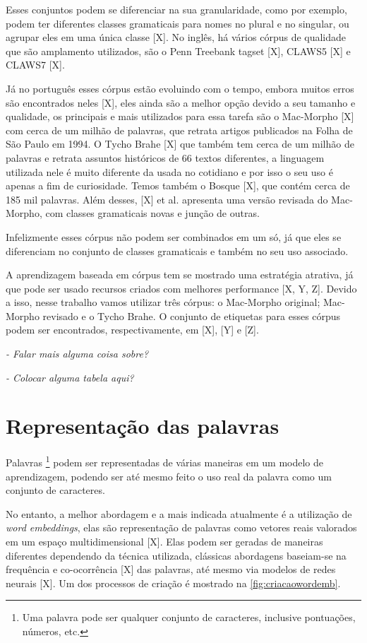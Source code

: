 Esses conjuntos podem se diferenciar na sua granularidade, como por exemplo, podem ter diferentes classes gramaticais para nomes no plural e no singular, ou agrupar eles em uma única classe [X]. No inglês, há vários córpus de qualidade que são amplamento utilizados, são o Penn Treebank tagset [X], CLAWS5 [X] e CLAWS7 [X].

Já no português esses córpus estão evoluindo com o tempo, embora muitos erros são encontrados neles [X], eles ainda são a melhor opção devido a seu tamanho e qualidade, os principais e mais utilizados para essa tarefa são o Mac-Morpho [X] com cerca de um milhão de palavras, que retrata artigos publicados na Folha de São Paulo em 1994. O Tycho Brahe [X] que também tem cerca de um milhão de palavras e retrata assuntos históricos de 66 textos diferentes, a linguagem utilizada nele é muito diferente da usada no cotidiano e por isso o seu uso é apenas a fim de curiosidade. Temos também o Bosque [X], que contém cerca de 185 mil palavras. Além desses, [X] et al. apresenta uma versão revisada do Mac-Morpho, com classes gramaticais novas e junção de outras. 

Infelizmente esses córpus não podem ser combinados em um só, já que eles se diferenciam no conjunto de classes gramaticais e também no seu uso associado.

A aprendizagem baseada em córpus tem se mostrado uma estratégia atrativa, já que pode ser usado recursos criados com melhores performance [X, Y, Z]. Devido a isso, nesse trabalho vamos utilizar três córpus: o Mac-Morpho original; Mac-Morpho revisado e o Tycho Brahe. O conjunto de etiquetas para esses córpus podem ser encontrados, respectivamente, em [X], [Y] e [Z].


\textit{- Falar mais alguma coisa sobre?}

\textit{- Colocar alguma tabela aqui?}



\section{Representação das palavras}\label{sec:representacaodaspalavras}

Palavras \footnote{Uma palavra pode ser qualquer conjunto de caracteres, inclusive pontuações, números, etc.} podem ser representadas de várias maneiras em um modelo de aprendizagem, podendo ser até mesmo feito o uso real da palavra como um conjunto de caracteres.

No entanto, a melhor abordagem e a mais indicada atualmente é a utilização de \textit{word embeddings}, elas são representação de palavras como vetores reais valorados em um espaço multidimensional [X]. Elas podem ser geradas de maneiras diferentes dependendo da técnica utilizada, clássicas abordagens baseiam-se na frequência e co-ocorrência [X] das palavras, até mesmo via modelos de redes neurais [X]. Um dos processos de criação é mostrado na \autoref{fig:criacaowordemb}.

